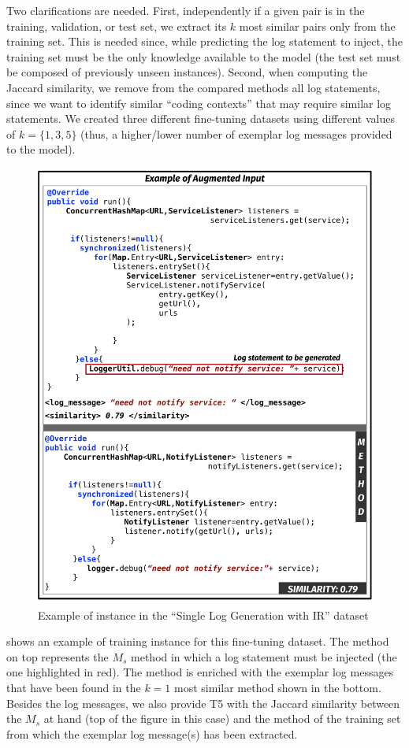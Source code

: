 Two clarifications are needed. First, independently if a given pair is in the training, validation, or test set, we extract its $k$ most similar pairs only from the training set. This is needed since, while predicting the log statement to inject, the training set must be the only knowledge available to the model (\ie the test set must be composed of previously unseen instances). Second, when computing the Jaccard similarity, we remove from the compared methods all log statements, since we want to identify similar ``coding contexts'' that may require similar log statements. We created three different fine-tuning datasets using different values of $k=\{1,3,5\}$ (thus, a higher/lower number of exemplar log messages provided to the model).

\begin{figure}[h!]
	\centering
	\includegraphics[width=0.9\columnwidth]{img/ir-example.pdf}
	\vspace{-0.2cm}
	\caption{Example of instance in the ``Single Log Generation with IR'' dataset}
	\label{fig:ir-example}
\end{figure}


 shows an example of training instance for this fine-tuning dataset. The method on top represents the $M_{s}$ \java method in which a log statement must be injected (\ie the one highlighted in red). The method is enriched with the exemplar log messages that have been found in the $k=1$ most similar method shown in the bottom. Besides the log messages, we also provide T5 with the Jaccard similarity between the $M_{s}$ at hand (top of the figure in this case) and the method of the training set from which the exemplar log message(s) has been extracted. 

